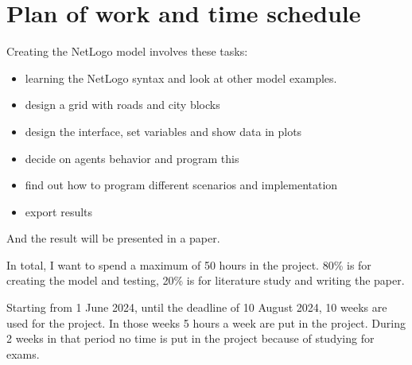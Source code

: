\section{Plan of work and time schedule}

Creating the NetLogo model involves these tasks:
\begin{itemize}
    \item learning the NetLogo syntax and look at other model examples.
    \item design a grid with roads and city blocks
    \item design the interface, set variables and show data in plots
    \item decide on agents behavior and program this
    \item find out how to program different scenarios and implementation
    \item export results
\end{itemize}

And the result will be presented in a paper.

In total, I want to spend a maximum of 50 hours in the project.
80\% is for creating the model and testing, 20\% is for literature study and writing the paper.

Starting from 1 June 2024, until the deadline of 10 August 2024, 10 weeks are used for the project.
In those weeks 5 hours a week are put in the project.
During 2 weeks in that period no time is put in the project because of studying for exams.
